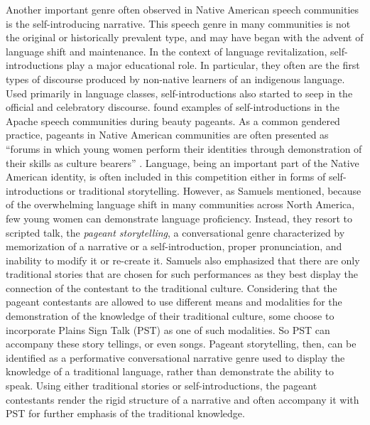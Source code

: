 \documentclass[12pt, draft]{article}
\begin{document}
Another important genre often observed in Native American speech communities is the self-introducing narrative. This speech genre in many communities is not the original or historically prevalent type, and may have began with the advent of language shift and maintenance. In the context of language revitalization, self-introductions play a major educational role. In particular, they often are the first types of discourse produced by non-native learners of an indigenous language. Used primarily in language classes, self-introductions also started to seep in the official and celebratory discourse. \textcite{samuels2004} found examples of self-introductions in the Apache speech communities during beauty pageants. As a common gendered practice, pageants in Native American communities are often presented as ``forums in which young women perform their identities through demonstration of their skills as culture bearers'' \parencite[p. 177]{samuels2004}. Language, being an important part of the Native American identity, is often included in this competition either in forms of self-introductions or traditional storytelling. However, as Samuels mentioned, because of the overwhelming language shift in many communities across North America, few young women can demonstrate language proficiency. Instead, they resort to scripted talk, the \textit{pageant storytelling}, a conversational genre characterized by memorization of a narrative or a self-introduction, proper pronunciation, and inability to modify it or re-create it. Samuels also emphasized that there are only traditional stories that are chosen for such performances as they best display the connection of the contestant to the traditional culture. Considering that the pageant contestants are allowed to use different means and modalities for the demonstration of the knowledge of their traditional culture, some choose to incorporate Plains Sign Talk (PST) as one of such modalities. So PST can accompany these story tellings, or even songs. Pageant storytelling, then, can be identified as a performative conversational narrative genre used to display the knowledge of a traditional language, rather than demonstrate the ability to speak. Using either traditional stories or self-introductions, the pageant contestants render the rigid structure of a narrative and often accompany it with PST for further emphasis of the traditional knowledge.
\end{document}
